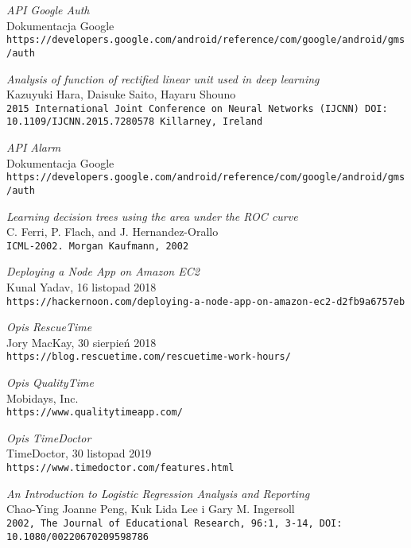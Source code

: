 \begin{thebibliography}{20}
\textit{API Google Auth}
\\Dokumentacja Google
\\\texttt{https://developers.google.com/android/reference/com/google/android/gms/auth}

\textit{Analysis of function of rectified linear unit used in deep learning}
\\Kazuyuki Hara, Daisuke Saito, Hayaru Shouno
\\\texttt{2015 International Joint Conference on Neural Networks (IJCNN) DOI: 10.1109/IJCNN.2015.7280578 Killarney, Ireland}

\textit{API Alarm}
\\Dokumentacja Google
\\\texttt{https://developers.google.com/android/reference/com/google/android/gms/auth}

\textit{Learning decision trees using the area under the ROC curve}
\\C. Ferri, P. Flach, and J. Hernandez-Orallo
\\\texttt{ICML-2002. Morgan Kaufmann, 2002}


\textit{Deploying a Node App on Amazon EC2}
\\Kunal Yadav, 16 listopad 2018
\\\texttt{https://hackernoon.com/deploying-a-node-app-on-amazon-ec2-d2fb9a6757eb}

\textit{Opis RescueTime}
\\Jory MacKay, 30 sierpień 2018
\\\texttt{https://blog.rescuetime.com/rescuetime-work-hours/}

\textit{Opis QualityTime}
\\Mobidays, Inc.
\\\texttt{https://www.qualitytimeapp.com/}



\textit{Opis TimeDoctor}
\\TimeDoctor, 30 listopad 2019
\\\texttt{https://www.timedoctor.com/features.html}

\textit{An Introduction to Logistic Regression Analysis and Reporting}
\\Chao-Ying Joanne Peng, Kuk Lida Lee i Gary M. Ingersoll 
\\\texttt{2002, The Journal of Educational Research, 96:1, 3-14, DOI: 10.1080/00220670209598786}




\end{thebibliography}
